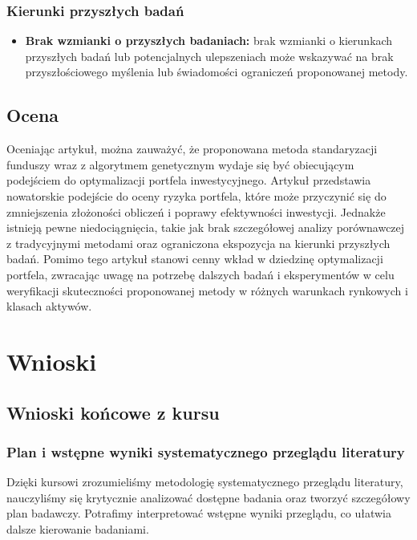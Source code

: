 \documentclass[polish,envcountsect,10pt]{article}
\begin{document}
\subsubsection{Kierunki przyszłych badań}

\begin{itemize}
	\item \textbf{Brak wzmianki o przyszłych badaniach:}
	brak wzmianki o kierunkach przyszłych badań lub potencjalnych ulepszeniach może wskazywać na brak przyszłościowego myślenia lub świadomości ograniczeń proponowanej metody.
\end{itemize}

\subsection{Ocena}

Oceniając artykuł, można zauważyć, że proponowana metoda standaryzacji funduszy wraz z algorytmem genetycznym wydaje się być obiecującym podejściem do optymalizacji portfela inwestycyjnego. Artykuł przedstawia nowatorskie podejście do oceny ryzyka portfela, które może przyczynić się do zmniejszenia złożoności obliczeń i poprawy efektywności inwestycji. Jednakże istnieją pewne niedociągnięcia, takie jak brak szczegółowej analizy porównawczej z tradycyjnymi metodami oraz ograniczona ekspozycja na kierunki przyszłych badań. Pomimo tego artykuł stanowi cenny wkład w dziedzinę optymalizacji portfela, zwracając uwagę na potrzebę dalszych badań i eksperymentów w celu weryfikacji skuteczności proponowanej metody w różnych warunkach rynkowych i klasach aktywów.

\section{Wnioski}

\subsection{Wnioski końcowe z kursu}

\subsubsection{Plan i wstępne wyniki systematycznego przeglądu literatury}

Dzięki kursowi zrozumieliśmy metodologię systematycznego przeglądu literatury, nauczyliśmy się krytycznie analizować dostępne badania oraz tworzyć szczegółowy plan badawczy. Potrafimy interpretować wstępne wyniki przeglądu, co ułatwia dalsze kierowanie badaniami.
\end{document}
